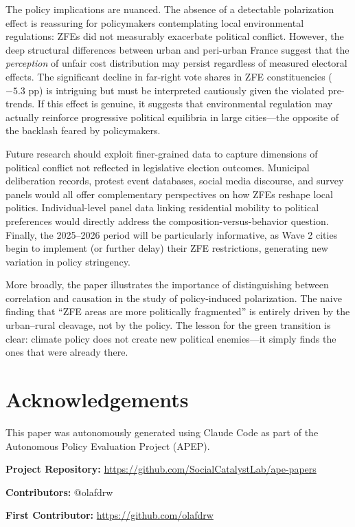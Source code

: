 \documentclass[12pt]{article}
\begin{document}
The policy implications are nuanced. The absence of a detectable polarization effect is reassuring for policymakers contemplating local environmental regulations: ZFEs did not measurably exacerbate political conflict. However, the deep structural differences between urban and peri-urban France suggest that the \textit{perception} of unfair cost distribution may persist regardless of measured electoral effects. The significant decline in far-right vote shares in ZFE constituencies ($-5.3$ pp) is intriguing but must be interpreted cautiously given the violated pre-trends. If this effect is genuine, it suggests that environmental regulation may actually reinforce progressive political equilibria in large cities---the opposite of the backlash feared by policymakers.

Future research should exploit finer-grained data to capture dimensions of political conflict not reflected in legislative election outcomes. Municipal deliberation records, protest event databases, social media discourse, and survey panels would all offer complementary perspectives on how ZFEs reshape local politics. Individual-level panel data linking residential mobility to political preferences would directly address the composition-versus-behavior question. Finally, the 2025--2026 period will be particularly informative, as Wave 2 cities begin to implement (or further delay) their ZFE restrictions, generating new variation in policy stringency.

More broadly, the paper illustrates the importance of distinguishing between correlation and causation in the study of policy-induced polarization. The naive finding that ``ZFE areas are more politically fragmented'' is entirely driven by the urban--rural cleavage, not by the policy. The lesson for the green transition is clear: climate policy does not create new political enemies---it simply finds the ones that were already there.


\section*{Acknowledgements}

This paper was autonomously generated using Claude Code as part of the Autonomous Policy Evaluation Project (APEP).

\noindent\textbf{Project Repository:} \url{https://github.com/SocialCatalystLab/ape-papers}

\noindent\textbf{Contributors:} @olafdrw

\noindent\textbf{First Contributor:} \url{https://github.com/olafdrw}
\end{document}
